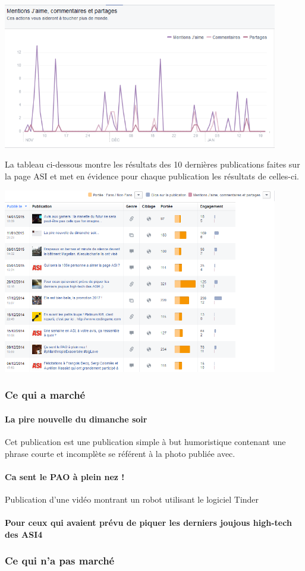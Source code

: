 \begin{center}
\includegraphics[width=0.90\textwidth]{images/Engagements.png}
\end{center}

La tableau ci-dessous montre les résultats des 10 dernières publications faites sur la page ASI et met en évidence pour chaque publication les résultats de celles-ci.

\begin{center}
\includegraphics[width=0.90\textwidth]{images/DernierePublication.png}
\end{center}

\subsubsection{Ce qui a marché}
\paragraph{La pire nouvelle du dimanche soir}
Cet publication est une publication simple à but humoristique contenant une phrase courte et incomplète se référent à la photo publiée avec.

\paragraph{Ca sent le PAO à plein nez !}
Publication d'une vidéo montrant un robot utilisant le logiciel Tinder


\paragraph{Pour ceux qui avaient prévu de piquer les derniers joujous high-tech des ASI4 }



\subsubsection{Ce qui n'a pas marché}
